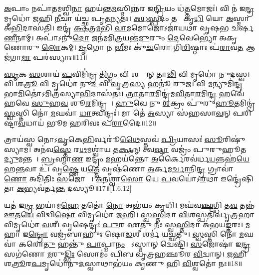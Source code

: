 \ul{𑌅}𑌪𑌾𑌂 𑌨𑌪𑌾॑𑌤𑌮𑌶𑍍𑌵𑌿\ul{𑌨𑌾} 𑌹𑌯॑𑌨𑍍𑌤\ul{𑌮}𑌸𑍍𑌮𑌿𑌨𑍍𑌨॑𑌰 𑌇\ul{𑌨𑍍𑌦𑍍𑌰𑌿}𑌯𑌂 𑌧॑\ul{𑌤𑍍𑌤}𑌮𑍋𑌜𑌃॑। 𑌵𑌿 𑌨॑ 𑌇\ul{𑌨𑍍𑌦𑍍𑌰} 𑌮𑍃𑌧𑍋॑ 𑌜𑌹𑌿 \ul{𑌨𑍀}𑌚𑌾 𑌯॑𑌚𑍍𑌛 𑌪𑍃𑌤\ul{𑌨𑍍𑌯}𑌤𑌃। \ul{𑌅}\ul{𑌧}\ul{𑌸𑍍𑌪}𑌦𑌂 𑌤𑌮𑍀𑌂᳚ 𑌕𑍃\ul{𑌧𑌿} 𑌯𑍋 \ul{𑌅}𑌸𑍍𑌮𑌾 𑌅॑\ul{𑌭𑌿}𑌦𑌾𑌸॑𑌤𑌿। 𑌇𑌨𑍍𑌦𑍍𑌰॑ \ul{𑌕𑍍𑌷}𑌤𑍍𑌰\ul{𑌮}𑌭𑌿 \ul{𑌵𑌾}𑌮𑌮𑍋𑌜𑍋𑌽𑌜𑌾॑𑌯𑌥𑌾 𑌵𑍃𑌷𑌭 𑌚𑌰𑍍\mbox{}𑌷\ul{𑌣𑍀}𑌨𑌾𑌮𑍍। 𑌅𑌪𑌾॑𑌽𑌨𑍁\ul{𑌦𑍋} 𑌜𑌨॑𑌮𑌮𑌿\ul{𑌤𑍍𑌰}𑌯𑌨𑍍𑌤॑\ul{𑌮𑍁}𑌰𑍁𑌂 \ul{𑌦𑍇}𑌵𑍇𑌭𑍍𑌯𑍋॑ 𑌅𑌕𑍃𑌣𑍋𑌰𑍁 \ul{𑌲𑍋}𑌕𑌮𑍍। \ul{𑌮𑍃}𑌗𑍋 𑌨 \ul{𑌭𑍀}𑌮𑌃 𑌕𑍁॑\ul{𑌚}𑌰𑍋 𑌗𑌿॑\ul{𑌰𑌿}𑌷𑍍𑌠𑌾𑌃 𑌪॑\ul{𑌰𑌾}𑌵\ul{𑌤} 𑌆 𑌜॑𑌗𑌾\ul{𑌮𑌾} 𑌪𑌰॑𑌸𑍍𑌯𑌾𑌃॥11॥
 
   \ul{𑌸𑍃}𑌕 \ul{𑌸}\ul{}𑌶𑌾𑌯॑ \ul{𑌪}𑌵𑌿𑌮𑌿॑𑌨𑍍𑌦𑍍𑌰 \ul{𑌤𑌿}𑌗𑍍𑌮𑌂 𑌵𑌿 𑌶𑌤𑍍𑌰𑍂᳚𑌨𑍍 𑌤𑌾\ul{𑌢𑌿} 𑌵𑌿 𑌮𑍃𑌧𑍋॑ 𑌨𑍁𑌦𑌸𑍍𑌵। 𑌵𑌿 𑌶\ul{𑌤𑍍𑌰𑍂}\an{} 𑌵𑌿 𑌮𑍃𑌧𑍋॑ 𑌨𑍁\ul{𑌦} 𑌵𑌿 \ul{𑌵𑍃}𑌤𑍍𑌰\ul{𑌸𑍍𑌯} 𑌹𑌨𑍂॑ 𑌰𑍁𑌜। 𑌵𑌿 \ul{𑌮}𑌨𑍍𑌯𑍁𑌮𑌿॑𑌨𑍍𑌦𑍍𑌰 𑌭𑌾\ul{𑌮𑌿}𑌤𑍋॑𑌽𑌮𑌿𑌤𑍍𑌰॑𑌸𑍍𑌯𑌾\ul{𑌭𑌿}𑌦𑌾𑌸॑𑌤𑌃। \ul{𑌤𑍍𑌰𑌾}𑌤𑌾\ul{𑌰}𑌮𑌿𑌨𑍍𑌦𑍍𑌰॑𑌮\ul{𑌵𑌿}𑌤𑌾\ul{𑌰}𑌮𑌿\ul{𑌨𑍍𑌦𑍍𑌰}\ul{} 𑌹𑌵𑍇॑𑌹𑌵𑍇 \ul{𑌸𑍁}𑌹\ul{𑌵}\ul{} 𑌶𑍂\ul{𑌰}𑌮𑌿𑌨𑍍𑌦𑍍𑌰𑌮𑍍᳚। \ul{𑌹𑍁}𑌵𑍇 𑌨𑍁 \ul{𑌶}𑌕𑍍𑌰𑌂 𑌪𑍁॑𑌰𑍁\ul{𑌹𑍂}𑌤𑌮𑌿𑌨𑍍𑌦𑍍𑌰॑ \ul{𑌸𑍍𑌵}𑌸𑍍𑌤𑌿 𑌨𑍋॑ \ul{𑌮}𑌘𑌵𑌾॑ \ul{𑌧𑌾}𑌤𑍍𑌵𑌿𑌨𑍍𑌦𑍍𑌰𑌃॑। 𑌮𑌾 𑌤𑍇॑ \ul{𑌅}𑌸𑍍𑌯𑌾 𑌸॑𑌹𑌸𑌾\ul{𑌵}𑌨𑍍 𑌪𑌰𑌿॑𑌷𑍍𑌟𑌾\ul{𑌵}𑌧𑌾𑌯॑ 𑌭𑍂𑌮 𑌹𑌰𑌿𑌵𑌃 𑌪\ul{𑌰𑌾}𑌦𑍈॥12॥ 
   
   𑌤𑍍𑌰𑌾𑌯॑𑌸𑍍𑌵 𑌨𑍋𑌽\ul{𑌵𑍃}𑌕𑍇\ul{𑌭𑌿}𑌰𑍍𑌵𑌰𑍂॑\ul{𑌥𑍈}𑌸𑍍𑌤𑌵॑ \ul{𑌪𑍍𑌰𑌿}𑌯𑌾𑌸𑌃॑ \ul{𑌸𑍂}𑌰𑌿𑌷𑍁॑ 𑌸𑍍𑌯𑌾𑌮। 𑌅𑌨॑𑌵\ul{𑌸𑍍𑌤𑍇} 𑌰\ul{𑌥}𑌮𑌶𑍍𑌵𑌾॑𑌯 𑌤\ul{𑌕𑍍𑌷}𑌨𑍍 𑌤𑍍𑌵\ul{𑌷𑍍𑌟𑌾} 𑌵𑌜𑍍𑌰𑌂॑ 𑌪𑍁𑌰𑍁𑌹𑍂𑌤 \ul{𑌦𑍍𑌯𑍁}𑌮𑌨𑍍𑌤𑌮𑍍᳚। \ul{𑌬𑍍𑌰}𑌹𑍍𑌮𑌾\ul{𑌣} 𑌇𑌨𑍍𑌦𑍍𑌰𑌂॑ \ul{𑌮}𑌹𑌯॑𑌨𑍍𑌤𑍋 \ul{𑌅}𑌰𑍍𑌕𑍈𑌰𑌵॑𑌰𑍍𑌧\ul{𑌯}𑌨𑍍𑌨𑌹॑\ul{𑌯𑍇} 𑌹\ul{𑌨𑍍𑌤}𑌵𑌾 𑌉॑। 𑌵𑍃\ul{𑌷𑍍𑌣𑍇} 𑌯\ul{𑌤𑍍𑌤𑍇} 𑌵𑍃𑌷॑𑌣𑍋 \ul{𑌅}𑌰𑍍𑌕𑌮\ul{𑌰𑍍𑌚𑌾}𑌨𑌿\ul{𑌨𑍍𑌦𑍍𑌰} 𑌗𑍍𑌰𑌾𑌵𑌾॑\ul{𑌣𑍋} 𑌅𑌦𑌿॑𑌤𑌿𑌃 \ul{𑌸}𑌜𑍋𑌷𑌾𑌃᳚। \ul{𑌅}\ul{𑌨}𑌶𑍍𑌵𑌾\ul{𑌸𑍋} 𑌯𑍇 \ul{𑌪}𑌵𑌯𑍋॑𑌽\ul{𑌰}𑌥𑌾 𑌇𑌨𑍍𑌦𑍍𑌰𑍇॑𑌷𑌿𑌤𑌾 \ul{𑌅}𑌭𑍍𑌯𑌵॑𑌰𑍍𑌤\ul{𑌨𑍍𑌤} 𑌦𑌸𑍍𑌯𑍂\sn{}॥17॥[1.6.12]


𑌯𑌤॑ 𑌇\ul{𑌨𑍍𑌦𑍍𑌰} 𑌭𑌯𑌾॑𑌮\ul{𑌹𑍇} 𑌤𑌤𑍋॑ \ul{𑌨𑍋} 𑌅𑌭॑𑌯𑌂 𑌕𑍃𑌧𑌿।
𑌮𑌘॑𑌵\ul{𑌞𑍍𑌛}𑌗𑍍𑌧𑌿 𑌤\ul{𑌵} 𑌤𑌨𑍍𑌨॑ \ul{𑌊}𑌤\ul{𑌯𑍇} 𑌵𑌿𑌦𑍍𑌵𑌿\ul{𑌷𑍋} 𑌵𑌿𑌮𑍃𑌧𑍋॑ 𑌜𑌹𑌿।
\ul{𑌸𑍍𑌵}\ul{𑌸𑍍𑌤𑌿}𑌦𑌾 \ul{𑌵𑌿}𑌶𑌸𑍍𑌪𑌤𑌿॑𑌰𑍍𑌵𑍃\ul{𑌤𑍍𑌰}𑌹𑌾 𑌵𑌿𑌮𑍃𑌧𑍋॑ \ul{𑌵}𑌶𑍀।
𑌵𑍃𑌷𑍇𑌨𑍍𑌦𑍍𑌰𑌃॑ \ul{𑌪𑍁}𑌰 𑌏𑌤𑍁॑ 𑌨𑌃 𑌸𑍍𑌵\ul{𑌸𑍍𑌤𑌿}𑌦𑌾 𑌅॑𑌭𑌯\ul{𑌙𑍍𑌕}𑌰𑌃।
\ul{𑌮}𑌹𑌾 𑌇\ul{𑌨𑍍𑌦𑍍𑌰𑍋} 𑌵𑌜𑍍𑌰॑𑌬𑌾𑌹𑍁𑌃 𑌷𑍋\ul{𑌡}𑌶𑍀 𑌶𑌰𑍍𑌮॑ 𑌯𑌚𑍍𑌛𑌤𑍁।
\ul{𑌸𑍍𑌵}𑌸𑍍𑌤𑌿 𑌨𑍋॑ \ul{𑌮}𑌘𑌵𑌾॑ 𑌕𑌰𑍋\ul{𑌤𑍁} 𑌹𑌨𑍍𑌤𑍁॑ \ul{𑌪𑌾}𑌪𑍍𑌮𑌾\ul{𑌨𑌂} 𑌯𑍋᳚𑌽𑌸𑍍𑌮𑌾𑌨𑍍‌ 𑌦𑍍𑌵𑍇𑌷𑍍𑌟𑌿॑।
\ul{𑌸}𑌜𑍋𑌷𑌾॑ 𑌇\ul{𑌨𑍍𑌦𑍍𑌰} 𑌸𑌗॑𑌣𑍋 \ul{𑌮}𑌰𑍁\ul{𑌦𑍍𑌭𑌿𑌃} 𑌸𑍋𑌮𑌂॑ 𑌪𑌿𑌬 𑌵𑍃𑌤𑍍𑌰𑌹𑌞𑍍𑌛𑍂𑌰 \ul{𑌵𑌿}𑌦𑍍𑌵𑌾𑌨𑍍‌।
\ul{𑌜}𑌹𑌿 𑌶\ul{𑌤𑍍𑌰𑍂}\ul{}𑌰\ul{𑌪}𑌮𑍃𑌧𑍋॑𑌨𑍁\ul{𑌦}𑌸𑍍𑌵𑌾𑌥𑌾𑌭॑𑌯𑌂 𑌕𑍃𑌣𑍁 𑌹𑌿 \ul{𑌵𑌿}𑌶𑍍𑌵𑌤𑍋॑ 𑌨𑌃॥18॥


